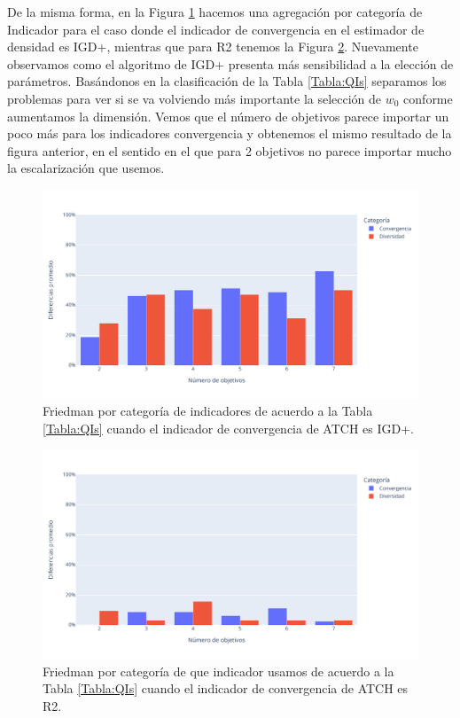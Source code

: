 De la misma forma, en la Figura \ref{fig:Friedman_Diferencia_por_categoria_IGD} hacemos una agregación por categoría de Indicador para el caso donde el indicador de convergencia en el estimador de densidad es IGD+, mientras que para R2 tenemos la Figura \ref{fig:Friedman_Diferencia_por_categoria_R2}. Nuevamente observamos como el algoritmo de IGD+ presenta más sensibilidad a la elección de parámetros. Basándonos en la clasificación de la Tabla \ref{Tabla:QIs} separamos los problemas para ver si se va volviendo más importante la selección de $w_0$ conforme aumentamos la dimensión. Vemos que el número de objetivos parece importar un poco más para los indicadores convergencia y obtenemos el mismo resultado de la figura anterior, en el sentido en el que para 2 objetivos no parece importar mucho la escalarización que usemos.

\begin{figure}[H]
    \centering
    \includegraphics[width=\textwidth]{Figuras/Friedman_Diferencia_por_categoria_IGD+.pdf}
    \caption[Friedman por categoría para IGD+.]{Friedman por categoría de indicadores de acuerdo a la Tabla \ref{Tabla:QIs} cuando el indicador de convergencia de ATCH es IGD+.}
    \label{fig:Friedman_Diferencia_por_categoria_IGD}
\end{figure}

\begin{figure}[H]
    \centering
    \includegraphics[width=\textwidth]{Figuras/Friedman_Diferencia_por_categoria_R2.pdf}
    \caption[Friedman por categoría para R2.]{Friedman por categoría de que indicador usamos de acuerdo a la Tabla \ref{Tabla:QIs} cuando el indicador de convergencia de ATCH es R2.}
    \label{fig:Friedman_Diferencia_por_categoria_R2}
\end{figure}


